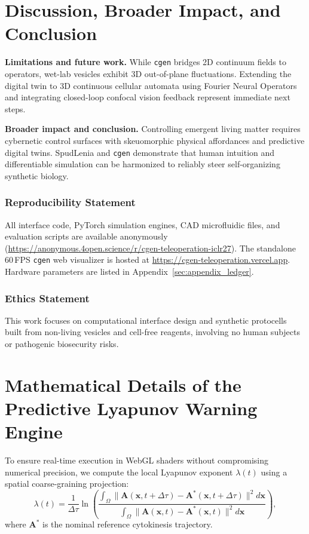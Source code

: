 \documentclass{article}
\begin{document}
\section{Discussion, Broader Impact, and Conclusion}
\textbf{Limitations and future work.} While \texttt{cgen} bridges 2D continuum fields to operators, wet-lab vesicles exhibit 3D out-of-plane fluctuations. Extending the digital twin to 3D continuous cellular automata using Fourier Neural Operators and integrating closed-loop confocal vision feedback represent immediate next steps.

\textbf{Broader impact and conclusion.} Controlling emergent living matter requires cybernetic control surfaces with skeuomorphic physical affordances and predictive digital twins. SpudLenia and \texttt{cgen} demonstrate that human intuition and differentiable simulation can be harmonized to reliably steer self-organizing synthetic biology.

\subsubsection*{Reproducibility Statement}
All interface code, PyTorch simulation engines, CAD microfluidic files, and evaluation scripts are available anonymously (\url{https://anonymous.4open.science/r/cgen-teleoperation-iclr27}). The standalone 60\,FPS \texttt{cgen} web visualizer is hosted at \url{https://cgen-teleoperation.vercel.app}. Hardware parameters are listed in Appendix~\ref{sec:appendix_ledger}.

\subsubsection*{Ethics Statement}
This work focuses on computational interface design and synthetic protocells built from non-living vesicles and cell-free reagents, involving no human subjects or pathogenic biosecurity risks.

\newpage



\newpage
\appendix

\section{Mathematical Details of the Predictive Lyapunov Warning Engine}
\label{sec:appendix_lyapunov}

To ensure real-time execution in WebGL shaders without compromising numerical precision, we compute the local Lyapunov exponent $\lambda(t)$ using a spatial coarse-graining projection:
\begin{equation}
\lambda(t) = \frac{1}{\Delta \tau} \ln \left( \frac{\int_{\Omega} \|\mathbf{A}(\mathbf{x}, t + \Delta \tau) - \mathbf{A}^*(\mathbf{x}, t + \Delta \tau)\|^2 d\mathbf{x}}{\int_{\Omega} \|\mathbf{A}(\mathbf{x}, t) - \mathbf{A}^*(\mathbf{x}, t)\|^2 d\mathbf{x}} \right),
\end{equation}
where $\mathbf{A}^*$ is the nominal reference cytokinesis trajectory. 
\end{document}
